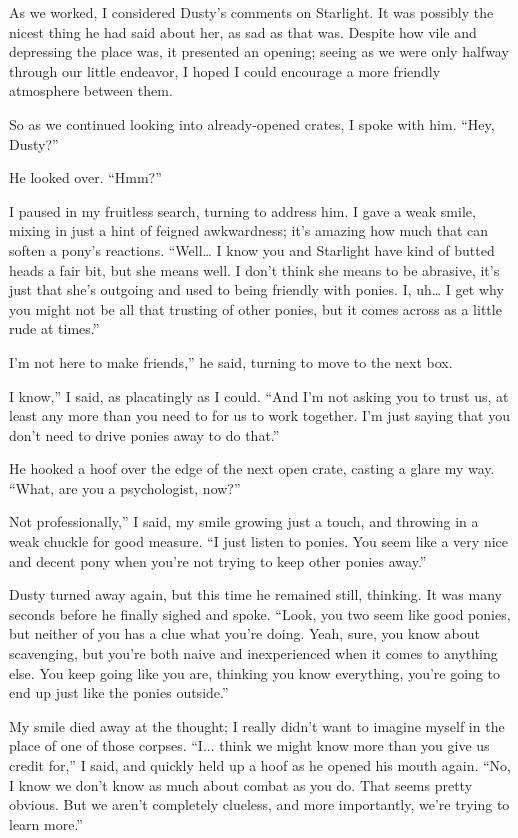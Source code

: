 As we worked, I considered Dusty’s comments on Starlight. It was possibly the nicest thing he had said about her, as sad as that was. Despite how vile and depressing the place was, it presented an opening; seeing as we were only halfway through our little endeavor, I hoped I could encourage a more friendly atmosphere between them.

So as we continued looking into already-opened crates, I spoke with him. “Hey, Dusty?”

He looked over. “Hmm?”

I paused in my fruitless search, turning to address him. I gave a weak smile, mixing in just a hint of feigned awkwardness; it’s amazing how much that can soften a pony’s reactions. “Well… I know you and Starlight have kind of butted heads a fair bit, but she means well. I don’t think she means to be abrasive, it’s just that she’s outgoing and used to being friendly with ponies. I, uh… I get why you might not be all that trusting of other ponies, but it comes across as a little rude at times.”

\leavevmode{}I’m not here to make friends,” he said, turning to move to the next box.

\leavevmode{}I know,” I said, as placatingly as I could. “And I’m not asking you to trust us, at least any more than you need to for us to work together. I’m just saying that you don’t need to drive ponies away to do that.”

He hooked a hoof over the edge of the next open crate, casting a glare my way. “What, are you a psychologist, now?”

\leavevmode{}Not professionally,” I said, my smile growing just a touch, and throwing in a weak chuckle for good measure. “I just listen to ponies. You seem like a very nice and decent pony when you’re not trying to keep other ponies away.”

Dusty turned away again, but this time he remained still, thinking. It was many seconds before he finally sighed and spoke. “Look, you two seem like good ponies, but neither of you has a clue what you’re doing. Yeah, sure, you know about scavenging, but you’re both naive and inexperienced when it comes to anything else. You keep going like you are, thinking you know everything, you’re going to end up just like the ponies outside.”

My smile died away at the thought; I really didn’t want to imagine myself in the place of one of those corpses. “I... think we might know more than you give us credit for,” I said, and quickly held up a hoof as he opened his mouth again. “No, I know we don’t know as much about combat as you do. That seems pretty obvious. But we aren’t completely clueless, and more importantly, we’re trying to learn more.”

